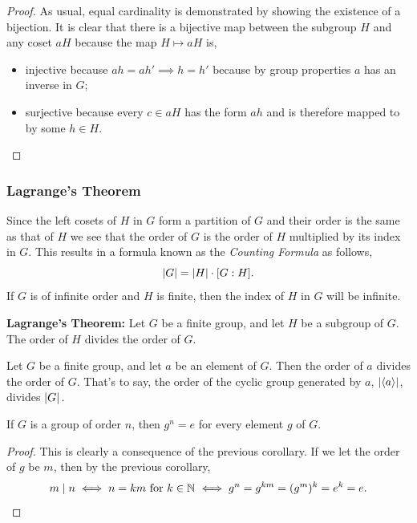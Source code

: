 \documentclass[MathsNotesBase.tex]{subfiles}
\begin{document}
{		
		\begin{proof}
			As usual, equal cardinality is demonstrated by showing the existence of a bijection. It is clear that there is a bijective map between the subgroup $H$ and any coset $aH$ because the map $H \longmapsto aH$ is,
			\begin{itemize}
				\item{injective because $ah = ah' \implies h = h'$ because by group properties $a$ has an inverse in $G$;}
				\item{surjective because every $c \in aH$ has the form $ah$ and is therefore mapped to by some $h \in H$.}
			\end{itemize}
		\end{proof}
	
		\subsubsection{Lagrange's Theorem}
		Since the left cosets of $H$ in $G$ form a partition of $G$ and their order is the same as that of $H$ we see that the order of $G$ is the order of $H$ multiplied by its index in $G$. This results in a formula known as the \textit{Counting Formula} as follows,
		\[ \left\lvert G\right\rvert = \left\lvert H\right\rvert \cdot [G:H]. \]
		If $G$ is of infinite order and $H$ is finite, then the index of $H$ in $G$ will be infinite.
		
		\begin{theorem}
			\textbf{Lagrange's Theorem: } Let $G$ be a finite group, and let $H$ be a subgroup of $G$. The order of $H$ divides the order of $G$.
		\end{theorem}
	
		\medskip
		\begin{corollary}
			Let $ G $ be a finite group, and let $ a $ be an element of $ G $. Then the order of $ a $ divides the order of $G$. That's to say, the order of the cyclic group generated by $a$, ${ \left\lvert\langle a \rangle\right\rvert }$, divides ${ \left\lvert G\right\rvert. }$
		\end{corollary}
	
		\medskip
		\begin{corollary}
			\label{coro:group_order_n_nth_power_of_elements_is_identity}
			If $ G $ is a group of order $ n $, then ${ g^n = e }$ for every element $ g $ of $ G $.
		\end{corollary}
		\begin{proof}
			This is clearly a consequence of the previous corollary. If we let the order of $g$ be $m$, then by the previous corollary, 
			\[ m \mid n \iff n = km \text{ for } k \in \mathbb{N}^{} \iff g^n = g^{km} = (g^m)^k = e^k = e. \qedhere \]
		\end{proof}
	
}
\end{document}
